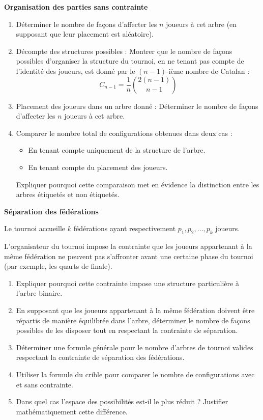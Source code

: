 \documentclass[10pt,a4paper]{article}
\begin{document}
\q \textbf{Organisation des parties sans contrainte}

\begin{enumerate}
    \item Déterminer le nombre de façons d'affecter les \( n \) joueurs à cet arbre (en supposant
    que leur placement est aléatoire).
    \item Décompte des structures possibles :
    Montrer que le nombre de façons possibles d'organiser la structure du tournoi, en ne tenant pas
    compte de l'identité des joueurs, est donné par le \( (n-1) \)-ième nombre de Catalan :
    \[
    C_{n-1} = \frac{1}{n} \binom{2(n-1)}{n-1}
    \]
    \item Placement des joueurs dans un arbre donné : Déterminer le nombre de façons d'affecter les
    \( n \) joueurs à cet arbre.
    \item Comparer le nombre total de configurations obtenues dans deux cas :
    \begin{itemize}
        \item En tenant compte uniquement de la structure de l'arbre.
        \item En tenant compte du placement des joueurs.
    \end{itemize}
    Expliquer pourquoi cette comparaison met en évidence la distinction entre les arbres étiquetés
    et non étiquetés.
\end{enumerate}


\q \textbf{Séparation des fédérations}

Le tournoi accueille \( k \) fédérations ayant respectivement \( p_1, p_2, \dots, p_k \) joueurs.

L'organisateur du tournoi impose la contrainte que les joueurs appartenant à la même fédération ne
peuvent pas s'affronter avant une certaine phase du tournoi (par exemple, les quarts de finale).

\begin{enumerate}
    \item  Expliquer pourquoi cette contrainte impose une structure particulière à l'arbre binaire.
    \item En supposant que les joueurs appartenant à la même fédération doivent être répartis de
    manière équilibrée dans l'arbre, déterminer le nombre de façons possibles de les disposer
    tout en respectant la contrainte de séparation.
    \item  Déterminer une formule générale pour le nombre d'arbres de tournoi valides
    respectant la contrainte de séparation des fédérations.
    \item Utiliser la formule du crible pour comparer le nombre de configurations avec et sans
    contrainte.
    \item Dans quel cas l'espace des possibilités est-il le plus réduit ? Justifier mathématiquement
    cette différence.
\end{enumerate}
\end{document}

